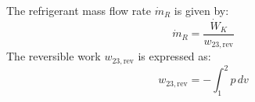 The refrigerant mass flow rate \( \dot{m}_R \) is given by:  
\[
\dot{m}_R = \frac{\dot{W}_K}{w_{23,\text{rev}}}
\]  
The reversible work \( w_{23,\text{rev}} \) is expressed as:  
\[
w_{23,\text{rev}} = -\int_{1}^{2} p \, dv
\]